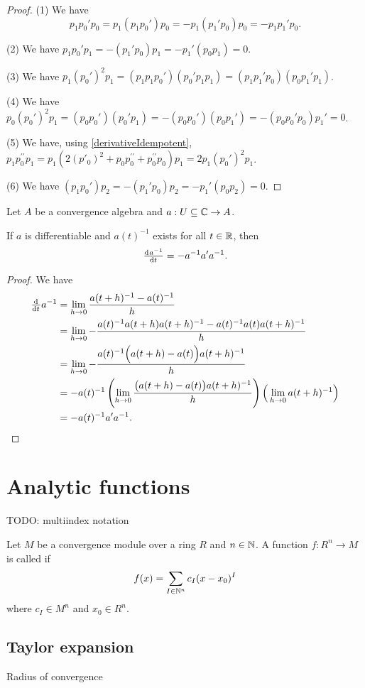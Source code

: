 \begin{proof}
(1) We have
\[ p_1p_0'p_0 = p_1(p_1p_0')p_0 = -p_1(p_1'p_0)p_0 = -p_1p_1'p_0. \]

(2) We have $p_1p_0'p_1 = -(p_1'p_0)p_1 = -p_1'(p_0p_1) = 0$.

(3) We have $p_1(p_0')^2p_1 = (p_1p_1p_0')(p_0'p_1p_1) = (p_1p_1'p_0)(p_0p_1'p_1)$.

(4) We have $p_0(p_0')^2p_1 = (p_0p_0')(p_0'p_1) = -(p_0p_0')(p_0p_1') = -(p_0p_0'p_0)p_1' = 0$.

(5) We have, using \ref{derivativeIdempotent}, $p_1p^{\prime\prime}_0p_1 = p_1(2(p'_0)^2 + p_0p_0^{\prime\prime} + p_0^{\prime\prime}p_0)p_1 = 2p_1(p_0')^2p_1$.

(6) We have $(p_1p_0')p_2 = - (p_1'p_0)p_2 = - p_1'(p_0p_2) = 0$.
\end{proof}


\begin{proposition}
Let $A$ be a convergence algebra and $a: U\subseteq\mathbb{C} \to A$.

If $a$ is differentiable and $a(t)^{-1}$ exists for all $t\in \mathbb{R}$, then
\[ \od{a^{-1}}{t} = -a^{-1}a'a^{-1}. \]
\end{proposition}
\begin{proof}
We have
\begin{align*}
\od{}{t}a^{-1} &= \lim_{h\to 0}\frac{a(t+h)^{-1} - a(t)^{-1}}{h} \\
&= \lim_{h\to 0} -\frac{a(t)^{-1}a(t+h)a(t+h)^{-1} - a(t)^{-1}a(t)a(t+h)^{-1}}{h} \\
&= \lim_{h\to 0} -\frac{a(t)^{-1}\Big(a(t+h) - a(t)\Big)a(t+h)^{-1}}{h} \\
&= -a(t)^{-1}\left(\lim_{h\to 0}\frac{\big(a(t+h) - a(t)\big)a(t+h)^{-1}}{h}\right)\Big(\lim_{h\to 0}a(t+h)^{-1}\Big) \\
&= -a(t)^{-1}a'a^{-1}.
\end{align*}
\end{proof}

\section{Analytic functions}
TODO: multiindex notation
\begin{definition}
Let $M$ be a convergence module over a ring $R$ and $n\in\mathbb{N}$. A function $f: R^n\to M$ is called  if
\[ f(x) = \sum_{I\in\mathbb{N}^n}c_I(x-x_0)^I \]
where $c_I\in M^n$ and $x_0\in R^n$.
\end{definition}

\subsection{Taylor expansion}
Radius of convergence

